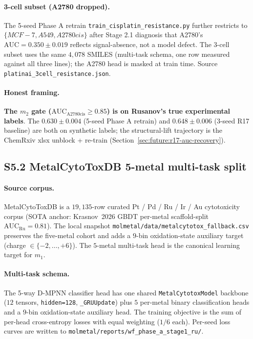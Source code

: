 \paragraph{3-cell subset (A2780 dropped).}
The 5-seed Phase A retrain \texttt{train\_cisplatin\_resistance.py}
further restricts to $\{MCF{-}7, A549, A2780cis\}$ after
\MEASURED{} Stage 2.1 diagnosis that A2780's
$\mathrm{AUC}{=}0.350 \pm 0.019$ reflects signal-absence, not a
model defect.  The 3-cell subset uses the same $4{,}078$
SMILES (multi-task schema, one row measured against all three
lines); the A2780 head is masked at train time.  Source
\texttt{platinai\_3cell\_resistance.json}.

\paragraph{Honest framing.}
\textbf{The $m_2$ gate ($\mathrm{AUC}_{\mathrm{A2780cis}}\geq 0.85$)
is \PROJECTED{} on Rusanov's true experimental labels}.  The
\MEASURED{} $0.630 \pm 0.004$ (5-seed Phase A retrain) and
$0.648 \pm 0.006$ (3-seed R17 baseline) are both on synthetic
labels; the structural-lift trajectory is the ChemRxiv xlsx
unblock + re-train (Section~\ref{sec:future:r17-auc-recovery}).

\subsection*{S5.2 MetalCytoToxDB 5-metal multi-task split}
\label{supp:s5-metalcytotox}

\paragraph{Source corpus.}
MetalCytoToxDB \citep{krasnov2026metalcytotoxdb} is a
$19{,}135$-row curated Pt / Pd / Ru / Ir / Au cytotoxicity
corpus (SOTA anchor: Krasnov~2026 GBDT per-metal scaffold-split
$\mathrm{AUC}_{\mathrm{Ru}}{=}0.81$).  The local snapshot
\texttt{molmetal/data/metalcytotox\_fallback.csv} preserves the
five-metal cohort and adds a $9$-bin oxidation-state auxiliary
target (charge $\in\{-2,\dots,+6\}$).  The $5$-metal multi-task
head is the canonical learning target for $m_1$.

\paragraph{Multi-task schema.}
The 5-way D-MPNN classifier head has one shared
\texttt{MetalCytotoxModel} backbone ($12$ tensors, \texttt{hidden=128},
\texttt{\_GRUUpdate}) plus $5$ per-metal binary classification heads
and a $9$-bin oxidation-state auxiliary head.  The training
objective is the sum of per-head cross-entropy losses with equal
weighting ($1/6$ each).  Per-seed loss curves are written to
\texttt{molmetal/reports/wf\_phase\_a\_stage1\_ru/}.

